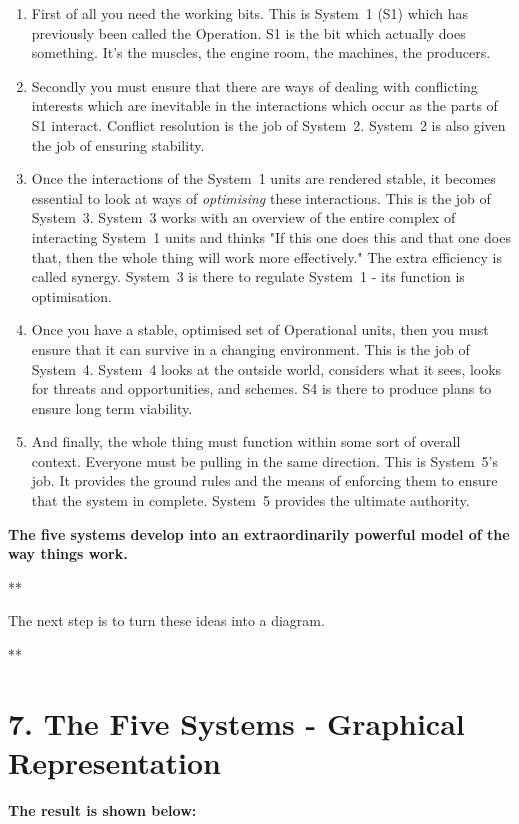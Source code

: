 \begin{enumerate}
  \item First of all you need the working bits. This is System 1 (S1) which has previously been called the Operation. S1 is the bit which actually does something. It's the muscles, the engine room, the machines, the producers.

  \item Secondly you must ensure that there are ways of dealing with conflicting interests which are inevitable in the interactions which occur as the parts of S1 interact. Conflict resolution is the job of System 2. System 2 is also given the job of ensuring stability.

  \item Once the interactions of the System 1 units are rendered stable, it becomes essential to look at ways of \textit{optimising} these interactions. This is the job of System 3. System 3 works with an overview of the entire complex of interacting System 1 units and thinks "If this one does this and that one does that, then the whole thing will work more effectively." The extra efficiency is called synergy. System 3 is there to regulate System 1 - its function is optimisation.

  \item Once you have a stable, optimised set of Operational units, then you must ensure that it can survive in a changing environment. This is the job of System 4. System 4 looks at the outside world, considers what it sees, looks for threats and opportunities, and schemes. S4 is there to produce plans to ensure long term viability.

  \item And finally, the whole thing must function within some sort of overall context. Everyone must be pulling in the same direction. This is System 5's job. It provides the ground rules and the means of enforcing them to ensure that the system in complete. System 5 provides the ultimate authority.

\end{enumerate}

\textbf{The five systems develop into an extraordinarily powerful model of the way things work.}

**

The next step is to turn these ideas into a diagram.

**

\section*{7. The Five Systems - Graphical Representation}
\textbf{The result is shown below:}

